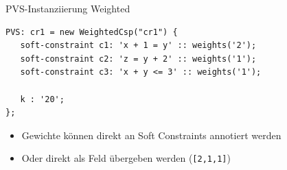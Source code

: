\begin{frame}[fragile]{PVS-Instanziierung Weighted}
\begin{lstlisting}
PVS: cr1 = new WeightedCsp("cr1") {
   soft-constraint c1: 'x + 1 = y' :: weights('2');
   soft-constraint c2: 'z = y + 2' :: weights('1');
   soft-constraint c3: 'x + y <= 3' :: weights('1');
   
   k : '20';
}; 
\end{lstlisting}
\begin{itemize}
\item Gewichte können direkt an Soft Constraints annotiert werden
\item Oder direkt als Feld übergeben werden (\texttt{[2,1,1]}) %
\end{itemize}
\end{frame}

